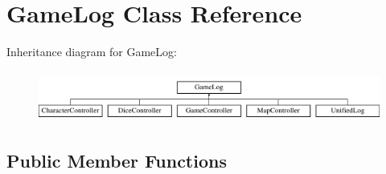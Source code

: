 \hypertarget{class_game_log}{}\section{Game\+Log Class Reference}
\label{class_game_log}
Inheritance diagram for Game\+Log\+:\begin{figure}[H]
\begin{center}
\leavevmode
\includegraphics[height=1.684211cm]{class_game_log}
\end{center}
\end{figure}
\subsection*{Public Member Functions}
